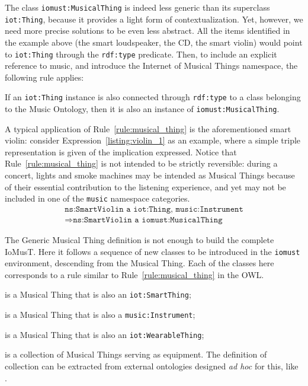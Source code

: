 The class \texttt{iomust:MusicalThing} is indeed less generic than its superclass \texttt{iot:Thing}, because it provides a light form of contextualization. Yet, however, we need more precise solutions to be even less abstract. All the items identified in the example above (the smart loudspeaker, the CD, the smart violin) would point to \texttt{iot:Thing} through the \texttt{rdf:type} predicate. Then, to include an explicit reference to music, and introduce the Internet of Musical Things namespace, the following rule applies:
\begin{rul}
\label{rule:musical_thing}
    If an \texttt{iot:Thing} instance is also connected through \texttt{rdf:type} to a class belonging to the Music Ontology, then it is also an instance of \texttt{iomust:MusicalThing}. 
\end{rul}
A typical application of Rule~\ref{rule:musical_thing} is the aforementioned smart violin:  consider Expression~\ref{listing:violin_1} as an example, where a simple triple representation is given of the implication expressed. Notice that Rule~\ref{rule:musical_thing} is not intended to be strictly reversible: during a concert, lights and smoke machines may be intended as Musical Things because of their essential contribution to the listening experience, and yet may not be included in one of the \texttt{music} namespace categories. 
\begin{multline}
\label{listing:violin_1}
\texttt{ns:SmartViolin a iot:Thing, music:Instrument} \\ \Rightarrow \texttt{ns:SmartViolin a iomust:MusicalThing}
\end{multline}

The Generic Musical Thing definition is not enough to build the complete IoMusT. Here it follows a sequence of new classes to be introduced in the \texttt{iomust} environment, descending from the Musical Thing. Each of the classes here corresponds to a rule similar to Rule~\ref{rule:musical_thing} in the OWL.
\begin{description}[wide, labelindent=0pt]
\item[\texttt{iomust:SmartMusicalThing}] is a Musical Thing that is also an \texttt{iot:SmartThing};
\item[\texttt{iomust:SmartInstrument}] is a Musical Thing that is also a \texttt{music:Instrument};
\item[\texttt{iomust:WearableMusicalThing}] is a Musical Thing that is also an \texttt{iot:WearableThing};
\item[\texttt{iomust:StageEquipment}] is a collection of Musical Things serving as equipment. The definition of collection can be extracted from external ontologies designed \textit{ad hoc} for this, like .
\end{description}


